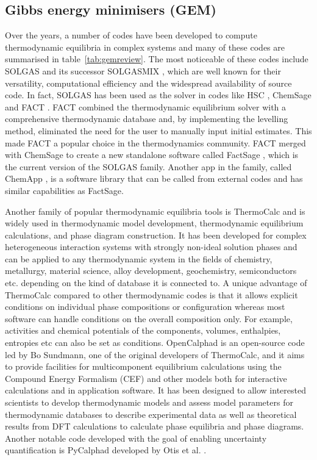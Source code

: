 \subsection{Gibbs energy minimisers (GEM)}
	Over the years, a number of codes have been developed to compute thermodynamic equilibria in complex systems and many of these codes are summarised in table~\ref{tab:gemreview}. The most noticeable of these codes include SOLGAS \cite{Eriksson71} and its successor SOLGASMIX \cite{Eriksson:1975aa}, which are well known for their versatility, computational efficiency and the widespread availability of source code. In fact, SOLGAS has been used as the solver in codes like HSC \cite{HSCSoftware:aa}, ChemSage \cite{Eriksson90} and FACT \cite{Thompson83}. FACT combined the thermodynamic equilibrium solver with a comprehensive thermodynamic database and, by implementing the levelling method, eliminated the need for the user to manually input initial estimates. This made FACT a popular choice in the thermodynamics community. FACT merged with ChemSage to create a new standalone software called FactSage \cite{Bale02}, which is the current version of the SOLGAS family. Another app in the family, called ChemApp \cite{Eriksson:2008aa,Petersen:2007aa}, is a software library that can be called from external codes and has similar capabilities as FactSage.

	Another family of popular thermodynamic equilibria tools is ThermoCalc \cite{ANDERSSON2002273} and is widely used in thermodynamic model development, thermodynamic equilibrium calculations, and  phase diagram construction. It has been developed for complex heterogeneous interaction systems with strongly non-ideal solution phases and can be applied to any thermodynamic system in the fields of chemistry, metallurgy, material science, alloy development, geochemistry, semiconductors etc. depending on the kind of database it is connected to. A unique advantage of ThermoCalc compared to other thermodynamic codes is that it allows explicit conditions on individual phase compositions or configuration whereas most software can handle conditions on the overall composition only. For example, activities and chemical potentials of the components, volumes, enthalpies, entropies etc can also be set as conditions.  OpenCalphad \cite{Sundman:2015aa} is an open-source code led by Bo Sundmann, one of the original developers of ThermoCalc, and it aims to provide facilities for multicomponent equilibrium calculations using the Compound Energy Formalism (CEF) and other models both for interactive calculations and in application software. It has been designed to allow interested scientists to develop thermodynamic models and assess model parameters for thermodynamic databases to describe experimental data as well as theoretical results from DFT calculations to calculate phase equilibria and phase diagrams. Another notable code developed with the goal of enabling uncertainty quantification is PyCalphad developed by Otis et al. \cite{Otis:2017aa}.

